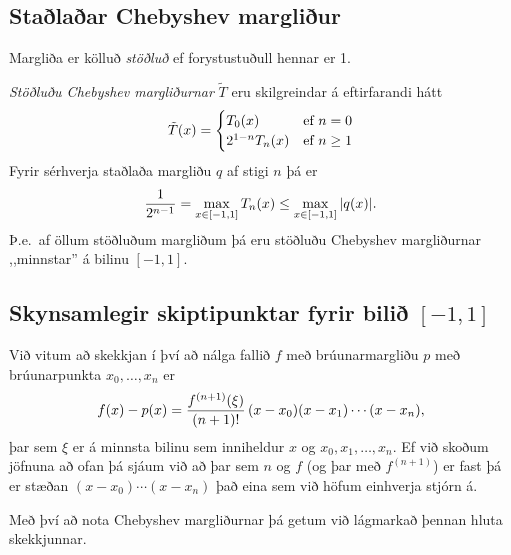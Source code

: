 \documentclass[A4paper,10pt,icelandic]{sphinxmanual}
\begin{document}

\subsection{Staðlaðar Chebyshev margliður}
\label{kafli03:index-16}\label{kafli03:stalaar-chebyshev-margliur}
Margliða er kölluð \emph{stöðluð} ef forystustuðull hennar er 1.

\emph{Stöðluðu Chebyshev margliðurnar} \(\tilde T\) eru skilgreindar á eftirfarandi hátt
\begin{gather}
\begin{split}\tilde T(x) =
    \begin{cases}
      T_0(x) & \text{ef } n = 0 \\
      2^{1-n}T_n(x)   & \text{ef } n\geq 1              \end{cases}\end{split}\notag
\end{gather}
Fyrir sérhverja staðlaða margliðu \(q\) af stigi
\(n\) þá er
\begin{gather}
\begin{split}\frac 1{2^{n-1}} = \max_{x\in [-1,1]} T_n(x) \leq \max_{x\in[-1,1]} |q(x)|.\end{split}\notag
\end{gather}
Þ.e. af öllum stöðluðum margliðum þá eru stöðluðu Chebyshev margliðurnar
,,minnstar” á bilinu \([-1,1]\).


\subsection{Skynsamlegir skiptipunktar fyrir bilið \([-1,1]\)}
\label{kafli03:skynsamlegir-skiptipunktar-fyrir-bili}
Við vitum að skekkjan í því að nálga fallið \(f\) með
brúunarmargliðu \(p\) með brúunarpunkta \(x_0,\ldots,x_n\) er
\begin{gather}
\begin{split}f(x)-p(x) = \frac{f^{(n+1)}(\xi)}{(n+1)!}\, (x-x_0)(x-x_1)\cdots (x-x_n),\end{split}\notag
\end{gather}
þar sem \(\xi\) er á minnsta bilinu sem inniheldur \(x\) og
\(x_0,x_1,\ldots,x_n\). Ef við skoðum jöfnuna að ofan þá sjáum við
að þar sem \(n\) og \(f\) (og þar með \(f^{(n+1)}\)) er fast
þá er stæðan \((x-x_0)\cdots(x-x_n)\) það eina sem við höfum
einhverja stjórn á.

Með því að nota Chebyshev margliðurnar þá getum við lágmarkað þennan
hluta skekkjunnar.
\end{document}
